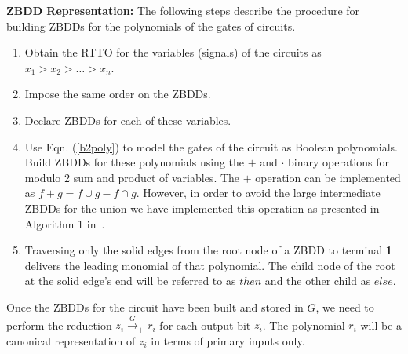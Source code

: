{\bf ZBDD Representation:} %
The following steps describe the procedure for building ZBDDs for the polynomials of the gates of circuits.
\begin{enumerate}
	\item Obtain the RTTO for the variables (signals) of the circuits as $x_1 > x_2 > \dots > x_n$.
	\item Impose the same order on the ZBDDs.
	\item Declare ZBDDs for each of these variables.
	\item Use Eqn. (\ref{b2poly}) to model the gates of the circuit as Boolean polynomials. Build ZBDDs for
	these polynomials using the $+$ and $\cdot$ binary operations for modulo 2 sum and product of variables. The $+$
  operation can be implemented as $f+g = f \cup g - f \cap g$. However, in order to avoid the large intermediate 
  ZBDDs for the union we have implemented this operation as presented in Algorithm 1 in~\cite{polybori:2009}. 
	\item Traversing only the solid edges from the root node of a ZBDD to
  terminal {\bf 1} delivers the leading monomial of that polynomial.  
  The child node of the root at the solid edge's end will be 
  referred to as $then$ and the other child as $else$.
\end{enumerate} 


Once the ZBDDs for the circuit have been built and stored in $G$, we need to perform the reduction
$z_i \xrightarrow{G}_+r_i$ for each output bit $z_i$. The polynomial $r_i$ will be a canonical 
representation of $z_i$ in terms of primary inputs only. 


